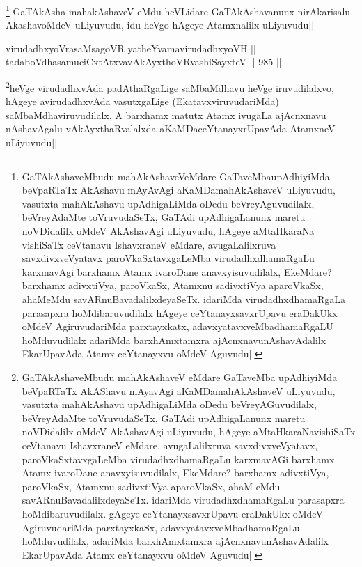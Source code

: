 \begin{artha}
\footnote{GaTAkAshaveMbudu mahAkAshaveVeMdare GaTaveMbaupAdhiyiMda beVpaRTaTx AkAshavu mAyAvAgi aKaMDamahAkAshaveV uLiyuvudu, vasutxta mahAkAshavu upAdhigaLiMda oDedu beVreyAguvudilalx, beVreyAdaMte toVruvudaSeTx, GaTAdi upAdhigaLanunx maretu noVDidalilx oMdeV AkAshavAgi uLiyuvudu, hAgeye aMtaHkaraNa vishiSaTx ceVtanavu IshavxraneV eMdare, avugaLalilxruva savxdivxveVyatavx paroVkaSxtavxgaLeMba virudadhxdhamaRgaLu karxmavAgi barxhamx Atamx ivaroDane anavxyisuvudilalx, EkeMdare? barxhamx adivxtiVya, paroVkaSx, Atamxnu sadivxtiVya aparoVkaSx, ahaMeMdu savARnuBavadalilxdeyaSeTx. idariMda virudadhxdhamaRgaLa parasapxra hoMdibaruvudilalx hAgeye ceYtanayxsavxrUpavu eraDakUkx oMdeV AgiruvudariMda parxtayxkatx, adavxyatavxveMbadhamaRgaLU hoMduvudilalx adariMda barxhAmxtamxra ajAcnxnavunAshavAdalilx EkarUpavAda Atamx ceYtanayxvu oMdeV Aguvudu||} GaTAkAsha mahakAshaveV eMdu heVLidare GaTAkAshavanunx nirAkarisalu AkashavoMdeV uLiyuvudu, idu heVgo hAgeye Atamxnalilx uLiyuvudu||
\end{artha}


\begin{shl}
virudadhxyoVrasaMsagoVR yatheYvamavirudadhxyoVH || \\
tadaboVdhasamuciCxtAtxvavAkAyxthoVR\s vashiSayxteV ||  985 ||  
\end{shl}

\begin{artha}
\footnote{GaTAkAshaveMbudu mahAkAshaveV eMdare GaTaveMba upAdhiyiMda beVpaRTaTx AkAShavu mAyavAgi aKaMDamahAkAshaveV uLiyuvudu, vasutxta mahAkAshavu upAdhigaLiMda oDedu beVreyAGuvudilalx, beVreyAdaMte toVruvudaSeTx, GaTAdi upAdhigaLanunx maretu noVDidalilx oMdeV AkAshavAgi uLiyuvudu, hAgeye aMtaHkaraNavishiSaTx ceVtanavu IshavxraneV eMdare, avugaLalilxruva savxdivxveVyatavx, paroVkaSxtavxgaLeMba virudadhxdhamaRgaLu karxmavAGi barxhamx Atamx ivaroDane anavxyisuvudilalx, EkeMdare? barxhamx adivxtiVya, paroVkaSx, Atamxnu sadivxtiVya aparoVkaSx, ahaM eMdu savARnuBavadalilxdeyaSeTx. idariMda virudadhxdhamaRgaLu parasapxra hoMdibaruvudilalx. gAgeye ceYtanayxsavxrUpavu eraDakUkx oMdeV AgiruvudariMda parxtayxkaSx, adavxyatavxveMbadhamaRgaLu hoMduvudilalx, adariMda barxhAmxtamxra ajAcnxnavunAshavAdalilx EkarUpavAda Atamx ceYtanayxvu oMdeV Aguvudu||}heVge virudadhxvAda padAthaRgaLige saMbaMdhavu heVge iruvudilalxvo, hAgeye avirudadhxvAda vasutxgaLige (EkatavxviruvudariMda) saMbaMdhaviruvudilalx, A barxhamx matutx Atamx ivugaLa ajAcnxnavu nAshavAgalu vAkAyxthaRvalalxda aKaMDaceYtanayxrUpavAda AtamxneV uLiyuvudu||
\end{artha}

